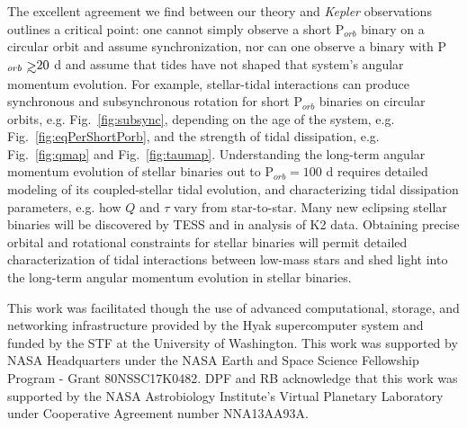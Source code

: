\documentclass[twocolumn]{aastex61}
\def\gsim{~\rlap{$>$}{\lower 1.0ex\hbox{$\sim$}}}
\newcommand{\kepler}[0]{\textit{Kepler}\xspace}
\begin{document}
The excellent agreement we find between our theory and \kepler observations outlines a critical point: one cannot simply observe a short P$_{orb}$ binary on a circular orbit and assume synchronization, nor can one observe a binary with P$_{orb} \gsim 20$ d and assume that tides have not shaped that system's angular momentum evolution.  For example, stellar-tidal interactions can produce synchronous and subsynchronous rotation for short P$_{orb}$ binaries on circular orbits, e.g. Fig.~\ref{fig:subsync}, depending on the age of the system, e.g. Fig.~\ref{fig:eqPerShortPorb}, and the strength of tidal dissipation, e.g. Fig.~\ref{fig:qmap} and Fig.~\ref{fig:taumap}.  Understanding the long-term angular momentum evolution of stellar binaries out to P$_{orb} = 100$ d requires detailed modeling of its coupled-stellar tidal evolution, and characterizing tidal dissipation parameters, e.g. how $Q$ and $\tau$ vary from star-to-star. Many new eclipsing stellar binaries will be discovered by TESS \citep[e.g.][]{Sullivan2015,Matson2018} and in analysis of K2 data.  Obtaining precise orbital and rotational constraints for stellar binaries will permit detailed characterization of tidal interactions between low-mass stars and shed light into the long-term angular momentum evolution in stellar binaries. 

\acknowledgments
This work was facilitated though the use of advanced computational, storage, and networking infrastructure provided by the Hyak supercomputer system and funded by the STF at the University of Washington. This work was supported by NASA Headquarters under the NASA Earth and Space Science Fellowship Program - Grant 80NSSC17K0482.  DPF and RB acknowledge that this work was supported by the NASA Astrobiology Institute's Virtual Planetary Laboratory under Cooperative Agreement number NNA13AA93A.



\end{document}
